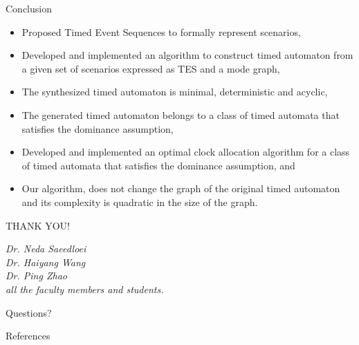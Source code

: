 \documentclass[10pt]{beamer}
\theoremstyle{plain}
\theoremstyle{definition}
\begin{document}
\begin{frame}{Conclusion}
	\begin{itemize}
		\item Proposed Timed Event Sequences to formally represent scenarios,
		\item Developed and implemented an algorithm to construct timed automaton  from a given set of scenarios expressed as TES and a mode graph,
		\item The synthesized timed automaton is minimal, deterministic and acyclic,
		\item The generated timed automaton belongs to a class of timed automata that satisfies the dominance assumption,
		\item Developed and implemented an optimal clock allocation algorithm for a class of timed automata that satisfies the dominance assumption, and
		\item Our algorithm, does not change the graph of the original timed automaton and its complexity is quadratic in the size of the graph.
	\end{itemize}
\end{frame}

\begin{frame}[standout]
\Huge THANK YOU! \\
\vspace{0.5cm}
\small

\emph{Dr. Neda Saeedloei}\\
\emph{Dr. Haiyang Wang}\\
\emph{Dr. Ping Zhao}\\
\emph{all the faculty members and students.}
\end{frame}

\begin{frame}[standout]
	Questions?
\end{frame}


\begin{frame}[allowframebreaks]{References}
	
	
\end{frame}
\end{document}
